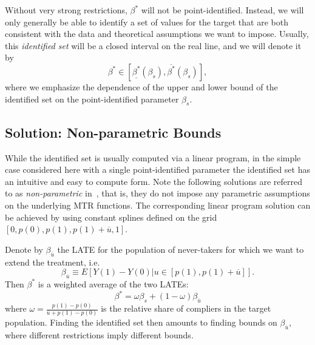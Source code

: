 \documentclass[12pt,a4paper,english]{article} %
\numberwithin{equation}{section}
\theoremstyle{definition}
\theoremstyle{remark}
\theoremstyle{plain}
\begin{document}
Without very strong restrictions, $\beta^*$ will not be point-identified.
Instead, we will only generally be able to identify a set of values for the target that are both consistent with the data and theoretical assumptions we want to impose.
Usually, this \textit{identified set} will be a closed interval on the real line, and we will denote it by
\begin{equation*}
  \beta^* \in [\underline{\beta^*}(\beta_s), \overline{\beta^*}(\beta_s)],
\end{equation*}
where we emphasize the dependence of the upper and lower bound of the identified set on the point-identified parameter $\beta_s$.

\subsection{Solution: Non-parametric Bounds}
While the identified set is usually computed via a linear program, in the simple case considered here with a single point-identified parameter the identified set has an intuitive and easy to compute form.
Note the following solutions are referred to as \textit{non-parametric} in~\cite{mogstad2018using}, that is, they do not impose any parametric assumptions on the underlying MTR functions.
The corresponding linear program solution can be achieved by using constant splines defined on the grid $[0, p(0), p(1), p(1) + \overline{u}, 1]$.

Denote by $\beta_{\overline{u}}$ the LATE for the population of never-takers for which we want to extend the treatment, i.e.
\begin{equation*}
  \beta_{\overline{u}} \equiv E[Y(1) - Y(0) | u \in [p(1), p(1) + \overline{u}]].
\end{equation*}
Then $\beta^*$ is a weighted average of the two LATEs:\@
\begin{equation*}
  \beta^* = \omega\beta_s + (1-\omega)\beta_{\overline{u}}
\end{equation*}
where $\omega = \frac{p(1) - p(0)}{\overline{u} + p(1) - p(0)}$ is the relative share of compliers in the target population.
Finding the identified set then amounts to finding bounds on $\beta_{\overline{u}}$, where different restrictions imply different bounds.
\end{document}
